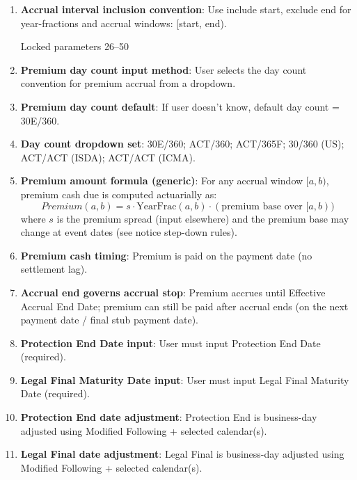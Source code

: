 \documentclass[11pt]{article}
\begin{document}
\begin{enumerate}[label=\arabic*),leftmargin=*,align=left]
\item \textbf{Accrual interval inclusion convention}: Use include start, exclude end for year-fractions and accrual windows: [start, end).

\vspace{1em}
\noindent Locked parameters 26–50
\vspace{0.5em}

\item \textbf{Premium day count input method}: User selects the day count convention for premium accrual from a dropdown.

\item \textbf{Premium day count default}: If user doesn’t know, default day count = 30E/360.

\item \textbf{Day count dropdown set}: 30E/360; ACT/360; ACT/365F; 30/360 (US); ACT/ACT (ISDA); ACT/ACT (ICMA).

\item \textbf{Premium amount formula (generic)}: For any accrual window $[a,b)$, premium cash due is computed actuarially as:
\[ Premium(a,b) = s \cdot \text{YearFrac}(a,b) \cdot (\text{premium base over } [a,b)) \]
where $s$ is the premium spread (input elsewhere) and the premium base may change at event dates (see notice step-down rules).

\item \textbf{Premium cash timing}: Premium is paid on the payment date (no settlement lag).

\item \textbf{Accrual end governs accrual stop}: Premium accrues until Effective Accrual End Date; premium can still be paid after accrual ends (on the next payment date / final stub payment date).

\item \textbf{Protection End Date input}: User must input Protection End Date (required).

\item \textbf{Legal Final Maturity Date input}: User must input Legal Final Maturity Date (required).

\item \textbf{Protection End date adjustment}: Protection End is business-day adjusted using Modified Following + selected calendar(s).

\item \textbf{Legal Final date adjustment}: Legal Final is business-day adjusted using Modified Following + selected calendar(s).


\end{enumerate}
\end{document}

